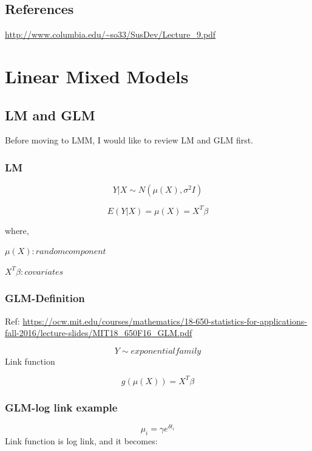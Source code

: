 \documentclass[]{book}
\begin{document}
\hypertarget{references}{%
\section{References}\label{references}}

\url{http://www.columbia.edu/~so33/SusDev/Lecture_9.pdf}

\hypertarget{linear-mixed-models}{%
\chapter{Linear Mixed Models}\label{linear-mixed-models}}

\hypertarget{lm-and-glm}{%
\section{LM and GLM}\label{lm-and-glm}}

Before moving to LMM, I would like to review LM and GLM first.

\hypertarget{lm}{%
\subsection{LM}\label{lm}}

\[Y|X \sim N(\mu(X),\sigma^2 I)\]

\[E(Y|X)=\mu(X)=X^T \beta\]

where,

\(\mu(X): random component\)

\(X^T \beta: covariates\)

\hypertarget{glm-definition}{%
\subsection{GLM-Definition}\label{glm-definition}}

Ref: \url{https://ocw.mit.edu/courses/mathematics/18-650-statistics-for-applications-fall-2016/lecture-slides/MIT18_650F16_GLM.pdf}

\[Y \sim exponential family\]
Link function

\[g(\mu(X))=X^T \beta\]

\hypertarget{glm-log-link-example}{%
\subsection{GLM-log link example}\label{glm-log-link-example}}

\[\mu_i = \gamma e^{\delta t_i}\]
Link function is log link, and it becomes:
\end{document}

